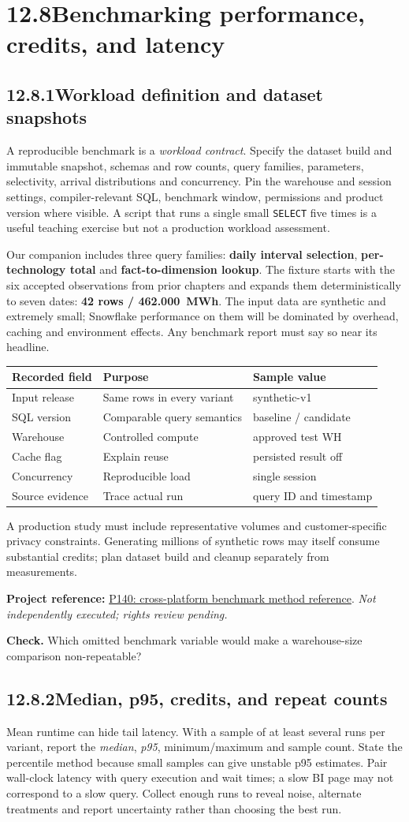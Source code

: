 \documentclass[11pt,twoside]{article}
\newcommand{\topic}[2]{\subsection*{#1\quad #2}}
\newcommand{\repo}[2]{\par\begingroup\fontsize{8.0}{9.6}\selectfont\sffamily\color{inkgray}\textbf{Project reference:} \href{#2}{#1}. \textit{Not independently executed; rights review pending.}\par\endgroup}
\begin{document}
\section*{12.8\quad Benchmarking performance, credits, and latency}
\topic{12.8.1}{Workload definition and dataset snapshots}
A reproducible benchmark is a \emph{workload contract}. Specify the dataset build and immutable snapshot, schemas and row counts, query families, parameters, selectivity, arrival distributions and concurrency. Pin the warehouse and session settings, compiler-relevant SQL, benchmark window, permissions and product version where visible. A script that runs a single small \texttt{SELECT} five times is a useful teaching exercise but not a production workload assessment.

Our companion includes three query families: \textbf{daily interval selection}, \textbf{per-technology total} and \textbf{fact-to-dimension lookup}. The fixture starts with the six accepted observations from prior chapters and expands them deterministically to seven dates: \textbf{42 rows / 462.000~MWh}. The input data are synthetic and extremely small; Snowflake performance on them will be dominated by overhead, caching and environment effects. Any benchmark report must say so near its headline.
\begin{center}\renewcommand{\arraystretch}{1.1}\begin{tabularx}{\linewidth}{@{}p{35mm}XX@{}}\toprule
\textbf{Recorded field}&\textbf{Purpose}&\textbf{Sample value}\\\midrule
Input release&Same rows in every variant&synthetic-v1\\
SQL version&Comparable query semantics&baseline / candidate\\
Warehouse&Controlled compute&approved test WH\\
Cache flag&Explain reuse&persisted result off\\
Concurrency&Reproducible load&single session\\
Source evidence&Trace actual run&query ID and timestamp\\\bottomrule\end{tabularx}\end{center}
A production study must include representative volumes and customer-specific privacy constraints. Generating millions of synthetic rows may itself consume substantial credits; plan dataset build and cleanup separately from measurements.
\repo{P140: cross-platform benchmark method reference}{https://github.com/henbh/dbx-sf-benchmark}
\textbf{Check.} Which omitted benchmark variable would make a warehouse-size comparison non-repeatable?
\newpage
\topic{12.8.2}{Median, p95, credits, and repeat counts}
Mean runtime can hide tail latency. With a sample of at least several runs per variant, report the \emph{median}, \emph{p95}, minimum/maximum and sample count. State the percentile method because small samples can give unstable p95 estimates. Pair wall-clock latency with query execution and wait times; a slow BI page may not correspond to a slow query. Collect enough runs to reveal noise, alternate treatments and report uncertainty rather than choosing the best run.
\end{document}
